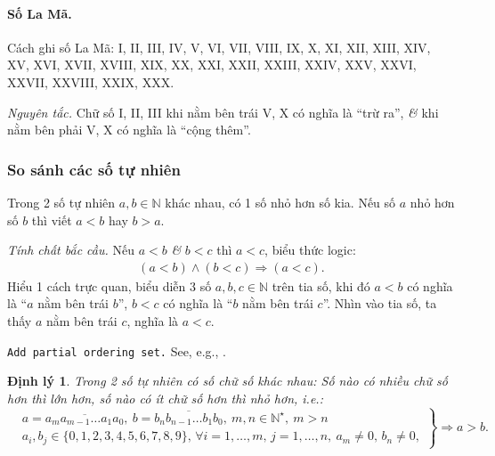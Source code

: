 \documentclass{article}
\numberwithin{equation}{section}
\newtheorem{theorem}{Định lý}[section]
\begin{document}
\paragraph{Số La Mã.} Cách ghi số La Mã: I, II, III, IV, V, VI, VII, VIII, IX, X, XI, XII, XIII, XIV, XV, XVI, XVII, XVIII, XIX, XX, XXI, XXII, XXIII, XXIV, XXV, XXVI, XXVII, XXVIII, XXIX, XXX.

\textit{Nguyên tắc.} Chữ số I, II, III khi nằm bên trái V, X có nghĩa là ``trừ ra'', \textit{\&} khi nằm bên phải V, X có nghĩa là ``cộng thêm''.

\subsubsection{So sánh các số tự nhiên}
Trong 2 số tự nhiên $a,b\in\mathbb{N}$ khác nhau, có 1 số nhỏ hơn số kia. Nếu số $a$ nhỏ hơn số $b$ thì viết $a < b$ hay $b > a$.

\textit{Tính chất bắc cầu.} Nếu $a < b$ \textit{\&} $b < c$ thì $a < c$, biểu thức logic:
\begin{align*}
	(a < b)\land(b < c)\Rightarrow(a < c).
\end{align*}
Hiểu 1 cách trực quan, biểu diễn 3 số $a,b,c\in\mathbb{N}$ trên tia số, khi đó $a < b$ có nghĩa là ``$a$ nằm bên trái $b$'', $b < c$ có nghĩa là ``$b$ nằm bên trái $c$''. Nhìn vào tia số, ta thấy $a$ nằm bên trái $c$, nghĩa là $a < c$.

\texttt{Add partial ordering set.} See, e.g., \cite{Halmos1960, Halmos1974, Kaplansky1972, Kaplansky1977}.

\begin{theorem}
	Trong 2 số tự nhiên có số chữ số khác nhau: Số nào có nhiều chữ số hơn thì lớn hơn, số nào có ít chữ số hơn thì nhỏ hơn, i.e.:
	\begin{equation}
		\label{compare number of digits}
		\left.\begin{split}
			&a = \overline{a_ma_{m-1}\ldots a_1a_0},\ b = \overline{b_nb_{n-1}\ldots b_1b_0},\ m,n\in\mathbb{N}^\star,\ m > n\\
			&a_i,b_j\in\{0,1,2,3,4,5,6,7,8,9\},\,\forall i = 1,\ldots,m,\,j = 1,\ldots,n,\ a_m\ne 0,\,b_n\ne 0,
		\end{split}\right\}\Rightarrow a > b.		
	\end{equation}
\end{theorem}
\end{document}
